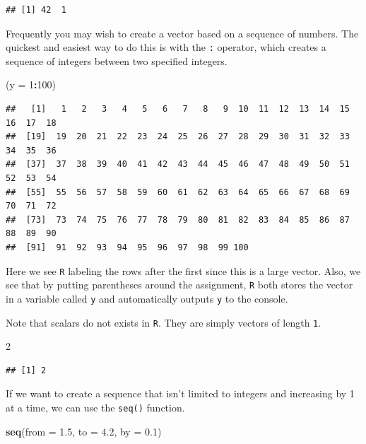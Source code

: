 \documentclass[]{book}
\newenvironment{Shaded}{\begin{snugshade}}{\end{snugshade}}
\newcommand{\KeywordTok}[1]{\textcolor[rgb]{0.13,0.29,0.53}{\textbf{#1}}}
\newcommand{\DataTypeTok}[1]{\textcolor[rgb]{0.13,0.29,0.53}{#1}}
\newcommand{\DecValTok}[1]{\textcolor[rgb]{0.00,0.00,0.81}{#1}}
\newcommand{\FloatTok}[1]{\textcolor[rgb]{0.00,0.00,0.81}{#1}}
\newcommand{\OperatorTok}[1]{\textcolor[rgb]{0.81,0.36,0.00}{\textbf{#1}}}
\newcommand{\NormalTok}[1]{#1}
\begin{document}
\begin{verbatim}
## [1] 42  1
\end{verbatim}

Frequently you may wish to create a vector based on a sequence of
numbers. The quickest and easiest way to do this is with the \texttt{:}
operator, which creates a sequence of integers between two specified
integers.

\begin{Shaded}
\begin{Highlighting}[]
\NormalTok{(}\DataTypeTok{y =} \DecValTok{1}\OperatorTok{:}\DecValTok{100}\NormalTok{)}
\end{Highlighting}
\end{Shaded}

\begin{verbatim}
##   [1]   1   2   3   4   5   6   7   8   9  10  11  12  13  14  15  16  17  18
##  [19]  19  20  21  22  23  24  25  26  27  28  29  30  31  32  33  34  35  36
##  [37]  37  38  39  40  41  42  43  44  45  46  47  48  49  50  51  52  53  54
##  [55]  55  56  57  58  59  60  61  62  63  64  65  66  67  68  69  70  71  72
##  [73]  73  74  75  76  77  78  79  80  81  82  83  84  85  86  87  88  89  90
##  [91]  91  92  93  94  95  96  97  98  99 100
\end{verbatim}

Here we see \texttt{R} labeling the rows after the first since this is a
large vector. Also, we see that by putting parentheses around the
assignment, \texttt{R} both stores the vector in a variable called
\texttt{y} and automatically outputs \texttt{y} to the console.

Note that scalars do not exists in \texttt{R}. They are simply vectors
of length \texttt{1}.

\begin{Shaded}
\begin{Highlighting}[]
\DecValTok{2}
\end{Highlighting}
\end{Shaded}

\begin{verbatim}
## [1] 2
\end{verbatim}

If we want to create a sequence that isn't limited to integers and
increasing by 1 at a time, we can use the \texttt{seq()} function.

\begin{Shaded}
\begin{Highlighting}[]
\KeywordTok{seq}\NormalTok{(}\DataTypeTok{from =} \FloatTok{1.5}\NormalTok{, }\DataTypeTok{to =} \FloatTok{4.2}\NormalTok{, }\DataTypeTok{by =} \FloatTok{0.1}\NormalTok{)}
\end{Highlighting}
\end{Shaded}
\end{document}
